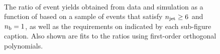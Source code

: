 \begin{figure}[h!]
\begin{center}
    \\
    \caption{The ratio of event yields obtained from data and simulation as a function of \mht [GeV] based on a sample of \mj events that satisfy $n_{\text{jet}} \geq 6$ and $n_{\text{b}} = 1$, as well as the requirements on \scalht indicated by each sub-figure caption. Also shown are fits to the ratios using first-order orthogonal polynomials.}
    \label{fig:mhtval_Mu_ge6j_eq1b}
  \end{center}
\end{figure}

